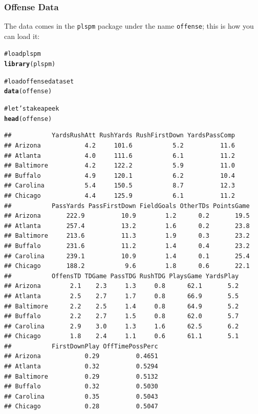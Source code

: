 \documentclass[12pt]{book}\usepackage{graphicx, color}
\makeatletter
\newcommand{\hlfunctioncall}[1]{\textcolor[rgb]{0.501960784313725,0,0.329411764705882}{\textbf{#1}}}%
\newcommand{\hlcomment}[1]{\textcolor[rgb]{0.180392156862745,0.6,0.341176470588235}{#1}}%
\newenvironment{kframe}{%
 \def\at@end@of@kframe{}%
 \ifinner\ifhmode%
  \def\at@end@of@kframe{\end{minipage}}%
  \begin{minipage}{\columnwidth}%
 \fi\fi%
 \def\FrameCommand##1{\hskip\@totalleftmargin \hskip-\fboxsep
 \colorbox{shadecolor}{##1}\hskip-\fboxsep
     \hskip-\linewidth \hskip-\@totalleftmargin \hskip\columnwidth}%
 \MakeFramed {\advance\hsize-\width
   \@totalleftmargin\z@ \linewidth\hsize
   \@setminipage}}%
 {\par\unskip\endMakeFramed%
 \at@end@of@kframe}
\newenvironment{knitrout}{}{} %
\newcommand{\plspm}{\texttt{plspm}}
\newcommand{\code}[1]{\texttt{#1}}
\makeatother
\begin{document}
\subsubsection*{Offense Data}
The data comes in the \plspm{} package under the name \code{offense}; this is how you can load it:
\begin{knitrout}\small
{}\color{fgcolor}\begin{kframe}
\begin{alltt}
\hlcomment{# load plspm}
\hlfunctioncall{library}(plspm)

\hlcomment{# load offense dataset}
\hlfunctioncall{data}(offense)

\hlcomment{# let's take a peek}
\hlfunctioncall{head}(offense)
\end{alltt}
\begin{verbatim}
##           YardsRushAtt RushYards RushFirstDown YardsPassComp
## Arizona            4.2     101.6           5.2          11.6
## Atlanta            4.0     111.6           6.1          11.2
## Baltimore          4.2     122.2           5.9          11.0
## Buffalo            4.9     120.1           6.2          10.4
## Carolina           5.4     150.5           8.7          12.3
## Chicago            4.4     125.9           6.1          11.2
##           PassYards PassFirstDown FieldGoals OtherTDs PointsGame
## Arizona       222.9          10.9        1.2      0.2       19.5
## Atlanta       257.4          13.2        1.6      0.2       23.8
## Baltimore     213.6          11.3        1.9      0.3       23.2
## Buffalo       231.6          11.2        1.4      0.4       23.2
## Carolina      239.1          10.9        1.4      0.1       25.4
## Chicago       188.2           9.6        1.8      0.6       22.1
##           OffensTD TDGame PassTDG RushTDG PlaysGame YardsPlay
## Arizona        2.1    2.3     1.3     0.8      62.1       5.2
## Atlanta        2.5    2.7     1.7     0.8      66.9       5.5
## Baltimore      2.2    2.5     1.4     0.8      64.9       5.2
## Buffalo        2.2    2.7     1.5     0.8      62.0       5.7
## Carolina       2.9    3.0     1.3     1.6      62.5       6.2
## Chicago        1.8    2.4     1.1     0.6      61.1       5.1
##           FirstDownPlay OffTimePossPerc
## Arizona            0.29          0.4651
## Atlanta            0.32          0.5294
## Baltimore          0.29          0.5132
## Buffalo            0.32          0.5030
## Carolina           0.35          0.5043
## Chicago            0.28          0.5047
\end{verbatim}
\end{kframe}
\end{knitrout}
\end{document}
